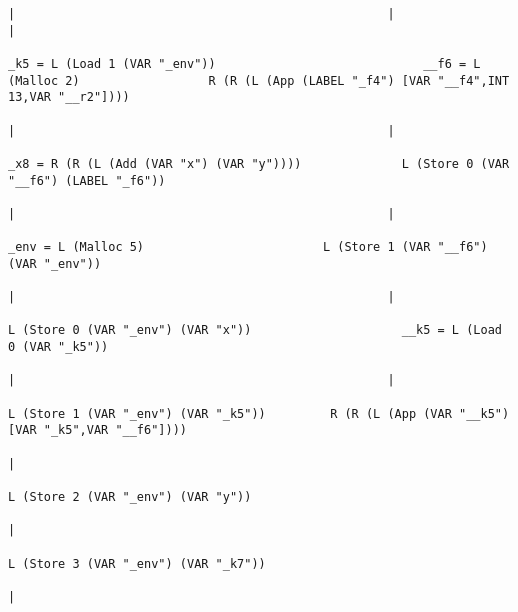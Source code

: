 \begin{landscape}
\begin{lstlisting}[basicstyle=\fontsize{5.5}{6.5}\selectfont\ttfamily]
                                                                                                                        |                                                    |                                                        |
                                                                                                          _k5 = L (Load 1 (VAR "_env"))                             __f6 = L (Malloc 2)                  R (R (L (App (LABEL "_f4") [VAR "__f4",INT 13,VAR "__r2"])))
                                                                                                                        |                                                    |
                                                                                                    _x8 = R (R (L (Add (VAR "x") (VAR "y"))))              L (Store 0 (VAR "__f6") (LABEL "_f6"))
                                                                                                                        |                                                    |
                                                                                                               _env = L (Malloc 5)                         L (Store 1 (VAR "__f6") (VAR "_env"))
                                                                                                                        |                                                    |
                                                                                                        L (Store 0 (VAR "_env") (VAR "x"))                     __k5 = L (Load 0 (VAR "_k5"))
                                                                                                                        |                                                    |
                                                                                                       L (Store 1 (VAR "_env") (VAR "_k5"))         R (R (L (App (VAR "__k5") [VAR "_k5",VAR "__f6"])))
                                                                                                                        |
                                                                                                        L (Store 2 (VAR "_env") (VAR "y"))
                                                                                                                        |
                                                                                                       L (Store 3 (VAR "_env") (VAR "_k7"))
                                                                                                                        |

\end{lstlisting}
\end{landscape}
